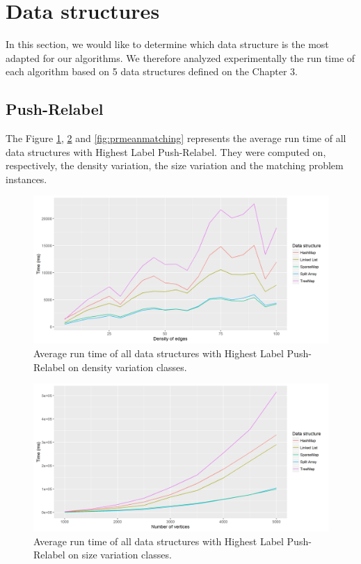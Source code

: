 \section{Data structures}

\label{sec:datastructuress}
In this section, we would like to determine which data structure is the most adapted for our algorithms. We therefore analyzed experimentally the run time of each algorithm based on 5 data structures defined on the Chapter 3.
\subsection{Push-Relabel}	
The Figure \ref{fig:prmeandensity}, \ref{fig:prmeansize} and \ref{fig:prmeanmatching} represents the average run time of all data structures with Highest Label Push-Relabel. They were computed on, respectively, the density variation, the size variation and the matching problem instances.
\begin{figure}[H]
\begin{center}
\includegraphics[scale=0.63]{images/results/prmeandensity.png}
\caption{Average run time of all data structures with Highest Label Push-Relabel on density variation classes.}
\label{fig:prmeandensity}
\end{center}
\end{figure}
\begin{figure}[H]
\begin{center}
\includegraphics[scale=0.6]{images/results/prmeansize.png}
\caption{Average run time of all data structures with Highest Label Push-Relabel on size variation classes.}
\label{fig:prmeansize}
\end{center}
\end{figure}
